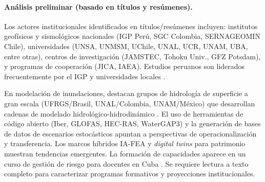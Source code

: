 \documentclass[12pt,a4paper]{article}
\begin{document}
\paragraph*{Análisis preliminar (basado en títulos y resúmenes).}
Los actores institucionales identificados en títulos/resúmenes incluyen: institutos geofísicos y sismológicos nacionales (IGP Perú, SGC Colombia, SERNAGEOMIN Chile), universidades (UNSA, UNMSM, UChile, UNAL, UCR, UNAM, UBA, entre otras), centros de investigación (JAMSTEC, Tohoku Univ., GFZ Potsdam), y programas de cooperación (JICA, IAEA). Estudios peruanos son liderados frecuentemente por el IGP y universidades locales \parencite{jimnez2023numerical, jimnez2021seismic, jimnez2023seismic, jimenez2024numerical, jimenez2025numerical, flores2026numerical, cuadrosrojas2024photogrammetry, aroquipa2025methodological, fernandezmorocho2026root}. 

En modelación de inundaciones, destacan grupos de hidrología de superficie a gran escala (UFRGS/Brasil, UNAL/Colombia, UNAM/México) que desarrollan cadenas de modelado hidrológico-hidrodinámico \parencite{fagundes2021sediment, fleischmann2021regional, escobarsilva2023assessing}. El uso de herramientas de código abierto (Iber, GLOFAS, HEC-RAS, WaterGAP3) y la generación de bases de datos de escenarios estocásticos \parencite{aranguiz2024new} apuntan a perspectivas de operacionalización y transferencia. Los marcos híbridos IA-FEA \parencite{yupanqui2025hybrid} y \textit{digital twins} para patrimonio \parencite{aroquipa2025methodological} muestran tendencias emergentes. La formación de capacidades aparece en un curso de gestión de riesgo para docentes en Cuba \parencite{varelaledesma2021tecnolog}. Se requiere lectura a texto completo para caracterizar programas formativos y proyecciones institucionales.

\end{document}
